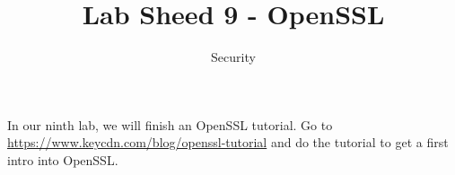 \documentclass{article}
\title{Lab Sheed 9 - OpenSSL}
\date{Security}
\begin{document}
\maketitle
In our ninth lab, we will finish an OpenSSL tutorial. Go to \href{https://www.keycdn.com/blog/openssl-tutorial}{https://www.keycdn.com/blog/openssl-tutorial} and do the tutorial to get a first intro into OpenSSL.
\end{document}
